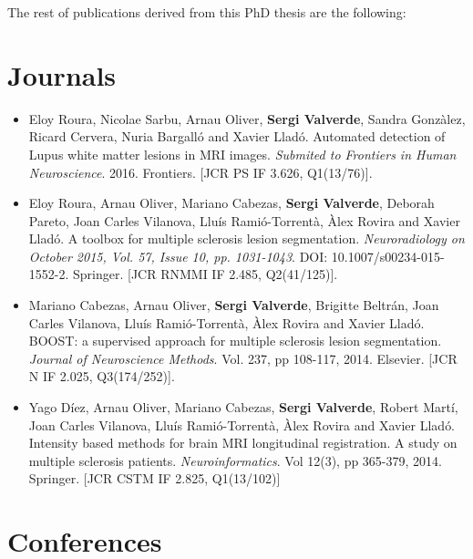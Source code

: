 The rest of publications derived from this PhD thesis are the following:

\section*{Journals}

\begin{itemize}

\item Eloy Roura, Nicolae Sarbu, Arnau Oliver, \textbf{Sergi Valverde}, Sandra Gonz\`{a}lez, Ricard Cervera, Nuria Bargall\'{o} and Xavier Llad\'{o}. Automated detection of Lupus white matter lesions in MRI images. \textit{Submited to Frontiers in Human Neuroscience}. 2016. Frontiers. [JCR PS IF 3.626, Q1(13/76)].

\item Eloy Roura, Arnau Oliver, Mariano Cabezas, \textbf{Sergi Valverde}, Deborah Pareto, Joan Carles Vilanova, Llu\'{i}s Rami\'{o}-Torrent\`{a}, \`{A}lex Rovira and Xavier Llad\'{o}. A toolbox for multiple sclerosis lesion segmentation. \textit{Neuroradiology on October 2015, Vol. 57, Issue 10, pp. 1031-1043}. DOI: 10.1007/s00234-015-1552-2. Springer. [JCR RNMMI IF 2.485, Q2(41/125)].

\item Mariano Cabezas, Arnau Oliver, \textbf{Sergi Valverde}, Brigitte Beltr\'{a}n, Joan Carles Vilanova, Llu\'{i}s Rami\'{o}-Torrent\`{a}, \`{A}lex Rovira and Xavier Llad\'{o}. BOOST: a supervised approach for multiple sclerosis lesion segmentation. \textit{Journal of Neuroscience Methods}. Vol. 237, pp 108-117, 2014. Elsevier. [JCR N IF 2.025, Q3(174/252)].

\item Yago D\'{i}ez, Arnau Oliver, Mariano Cabezas, \textbf{Sergi Valverde}, Robert Mart\'{i}, Joan Carles Vilanova, Llu\'{i}s Rami\'{o}-Torrent\`{a}, \`{A}lex Rovira and Xavier Llad\'{o}. Intensity based methods for brain MRI longitudinal registration. A study on multiple sclerosis patients. \textit{Neuroinformatics}. Vol 12(3), pp 365-379, 2014. Springer. [JCR CSTM IF 2.825, Q1(13/102)] 

\end{itemize}


\section*{Conferences}

